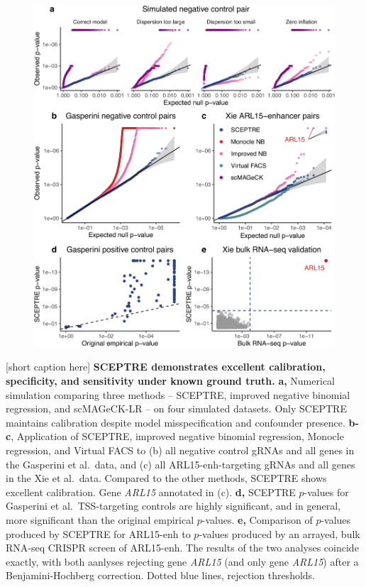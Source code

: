 \documentclass{nature}
\begin{document}
\clearpage
\begin{figure}[h!]
	\includegraphics[width = \textwidth]{figures/Figure3/Figure3_cropped.pdf}
 \end{figure}
[short caption here]{
	\label{fig:ground_truth}
	\textbf{SCEPTRE demonstrates excellent calibration, specificity, and sensitivity under known ground truth.} \textbf{a,} Numerical simulation comparing three methods -- SCEPTRE, improved negative binomial regression, and scMAGeCK-LR -- on four simulated datasets. Only SCEPTRE maintains calibration despite model misspecification and confounder presence. \textbf{b-c},  	Application of SCEPTRE, improved negative binomial regression, Monocle regression, and Virtual FACS to (b) all negative control gRNAs and all genes in the Gasperini et al.\ data, and (c) all ARL15-enh-targeting gRNAs and all genes in the Xie et al.\ data. Compared to the other methods, SCEPTRE shows excellent calibration. Gene \textit{ARL15} annotated in (c). \textbf{d,} SCEPTRE $p$-values for Gasperini et al.\ TSS-targeting controls are highly significant, and in general, more significant than the original empirical $p$-values. \textbf{e,} Comparison of $p$-values produced by SCEPTRE for ARL15-enh to $p$-values produced by an arrayed, bulk RNA-seq CRISPR screen of ARL15-enh. The results of the two analyses coincide exactly, with both aanlyses rejecting gene \textit{ARL15} (and only gene \textit{ARL15}) after a Benjamini-Hochberg correction. Dotted blue lines, rejection thresholds.}
\noindent\hrulefill
\end{document}
